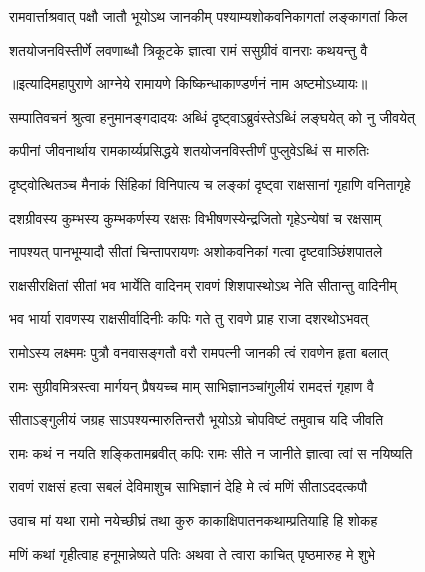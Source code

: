 \twolineshloka
{रामवार्त्ताश्रवात् पक्षौ जातौ भूयोऽथ जानकीम्}
{पश्याम्यशोकवनिकागतां लङ्कागतां किल}%

\twolineshloka
{शतयोजनविस्तीर्णे लवणाब्धौ त्रिकूटके}
{ज्ञात्वा रामं ससुग्रीवं वानराः कथयन्तु वै}%

॥इत्यादिमहापुराणे आग्नेये रामायणे किष्किन्धाकाण्डर्णनं नाम अष्टमोऽध्यायः॥


\twolineshloka
{सम्पातिवचनं श्रुत्वा हनुमानङ्गदादयः}
{अब्धिं दृष्ट्वाऽब्रुवंस्तेऽब्धिं लङ्घयेत् को नु जीवयेत्}%

\twolineshloka
{कपीनां जीवनार्थाय रामकार्य्यप्रसिद्धये}
{शतयोजनविस्तीर्णं पुप्लुवेऽब्धिं स मारुतिः}%

\twolineshloka
{दृष्ट्वोत्थितञ्च मैनाकं सिंहिकां विनिपात्य च }
{लङ्कां दृष्ट्वा राक्षसानां गृहाणि वनितागृहे}%

\twolineshloka
{दशग्रीवस्य कुम्भस्य कुम्भकर्णस्य रक्षसः}
{विभीषणस्येन्द्रजितो गृहेऽन्येषां च रक्षसाम्}%

\twolineshloka
{नापश्यत् पानभूम्यादौ सीतां चिन्तापरायणः}
{अशोकवनिकां गत्वा दृष्टवाञ्छिंशपातले}%

\twolineshloka
{राक्षसीरक्षितां सीतां भव भार्येति वादिनम्}
{रावणं शिशपास्थोऽथ नेति सीतान्तु वादिनीम्}%

\twolineshloka
{भव भार्या रावणस्य राक्षसीर्वादिनीः कपिः}
{गते तु रावणे प्राह राजा दशरथोऽभवत्}%

\twolineshloka
{रामोऽस्य लक्ष्ममः पुत्रौ वनवासङ्गतौ वरौ}
{रामपत्नी जानकी त्वं रावणेन हृता बलात्}%

\twolineshloka
{रामः सुग्रीवमित्रस्त्वा मार्गयन् प्रैषयच्च माम् }
{साभिज्ञानञ्चांगुलीयं रामदत्तं गृहाण वै}%

\twolineshloka
{सीताऽङ्गुलीयं जग्रह साऽपश्यन्मारुतिन्तरौ}
{भूयोऽग्रे चोपविष्टं तमुवाच यदि जीवति}%

\twolineshloka
{रामः कथं न नयति शङ्कितामब्रवीत् कपिः}
{रामः सीते न जानीते ज्ञात्वा त्वां स नयिष्यति}%

\twolineshloka
{रावणं राक्षसं हत्वा सबलं देविमाशुच}
{साभिज्ञानं देहि मे त्वं मणिं सीताऽददत्कपौ}%

\twolineshloka
{उवाच मां यथा रामो नयेच्छीघ्रं तथा कुरु}
{काकाक्षिपातनकथाम्प्रतियाहि हि शोकह}%

\twolineshloka
{मणिं कथां गृहीत्वाह हनूमान्नेष्यते पतिः }
{अथवा ते त्वारा काचित् पृष्ठमारुह मे शुभे}%

